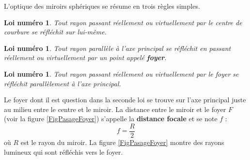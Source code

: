 \documentclass[a4paper,12pt]{book}
\newcommand{\pstMiroirSph}[9]{%
\pstMiddleAB{#1}{#2}{#4}		%
\pstTranslation{#1}{#2}{#3}[MiAl]
\pstInterLC{#3}{MiAl}{#1}{#2}{Miautr}{#5}
\pstInterLC{#3}{#1}{#1}{#2}{Miautr}{#7}
\pstInterLL{#5}{#4}{#3}{#1}{#9}		%
\pstTranslation{#9}{#5}{#5}[#6]		%
\pstTranslation{#9}{#7}{#7}[#8]
}
\newcommand{\pstTraceMiroirSph}[6]{%
\pstRotation[RotAngle=#4]{#1}{#2}[#6]
\pstRotation[RotAngle=-#4]{#1}{#2}[#5]
\pstMiddleAB{#1}{#2}{#3}
}
\newcounter{numloiphyz}
\theoremstyle{mes_exemples}	\newtheorem{exemple}[numtho]{Exemple}
\theoremstyle{mes_tho}
\newtheorem{loiphyz}[numloiphyz]{Loi numéro}
\newcommand{\defe}[2]{\textbf{#1}\index{#2}}
\begin{document}
L'optique des miroirs sphériques se résume en trois règles simples.
\setcounter{numloiphyz}{0}		%
\begin{loiphyz}\label{PgLoiMirSph}
Tout rayon passant réellement ou virtuellement par le centre de courbure se réfléchit sur lui-même.
\end{loiphyz}

\begin{loiphyz}
Tout rayon parallèle à l'axe principal se réfléchit en passant réellement ou virtuellement par un point appelé \defe{foyer}{}.
\end{loiphyz}

\begin{loiphyz}
Tout rayon passant réellement ou virtuellement par le foyer se réfléchit parallèlement à l'axe principal.
\end{loiphyz}
Le foyer dont il est question dans la seconde loi se trouve sur l'axe principal juste au milieu entre le centre et le miroir. La distance entre le miroir et le foyer $F$ (voir la figure \ref{FigPasageFoyer}) s'appelle la \defe{distance focale}{} et se note $f$ :
\begin{equation}
  f=\frac{ R }{ 2 }
\end{equation}
où $R$ est le rayon du miroir. La figure \ref{FigPasageFoyer} montre des rayons lumineux qui sont réfléchis vers le foyer.


\newcommand{\PreFigPassagefoyer}{%
\pstGeonode(0,0){C}(-3,0){Pm}(1.5,0.5){A}(1.5,-0.5){B}
\pstTranslation{Pm}{C}{C}[Pml]
\pstMiroirSph{C}{Pm}{A}{F}{AmP}{AmPl}{AmC}{AmCl}{iA}
\pstTraceMiroirSph{C}{Pm}{F}{55}{S1}{S2}

\pstMiroirSph{C}{Pm}{B}{F}{BmP}{BmPl}{BmC}{BmCl}{iB}
}
\end{document}
